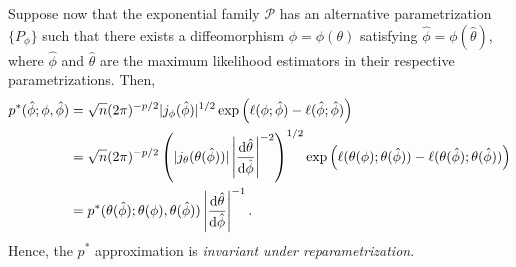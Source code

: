 Suppose now that the exponential family $\mathcal{P}$ has an alternative parametrization $\{ P_\phi \}$ such that there exists a diffeomorphism $\phi = \phi(\theta)$ satisfying $\hat\phi = \phi(\hat\theta)$, where $\hat\phi$ and $\hat\theta$ are the maximum likelihood estimators in their respective parametrizations. Then, 
\begin{align*}
    p^*(\hat\phi; \phi, \hat \phi) 
&= \sqrt{n} (2\pi)^{-p/2}|j_\phi(\hat\phi)|^{1/2} \exp\left(\ell(\phi; \hat \phi) - \ell(\hat\phi; \hat \phi)\right)\\
&= \sqrt{n} (2\pi)^{-p/2}\left(|j_\theta(\theta(\hat\phi))|\left|\frac{\text{d} \hat\theta}{\text{d} \hat\phi}\right|^{-2}\right)^{1/2} \exp\left(\ell(\theta(\phi); \theta(\hat \phi)) - \ell(\theta(\hat\phi); \theta(\hat \phi))\right)\\
&= p^*(\theta(\hat\phi); \theta(\phi), \theta(\hat \phi))\left|\frac{\text{d} \hat\theta}{\text{d} \hat\phi}\right|^{-1}.
\end{align*}
Hence, the $p^*$ approximation is \textit{invariant under reparametrization}. 


